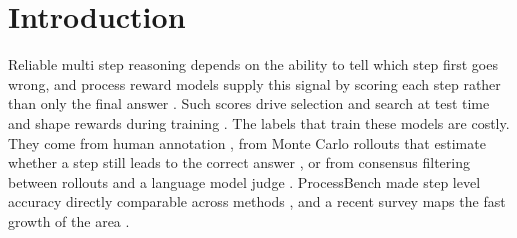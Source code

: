 
\section{Introduction}
\label{sec:intro}

Reliable multi step reasoning depends on the ability to tell which step first goes wrong, and process reward models supply this signal by scoring each step rather than only the final answer \citep{cobbe2021gsm8k, uesato2022solving, lightman2023lets}. Such scores drive selection and search at test time and shape rewards during training \citep{wang2022selfconsistency, snell2024scaling}. The labels that train these models are costly. They come from human annotation \citep{lightman2023lets}, from Monte Carlo rollouts that estimate whether a step still leads to the correct answer \citep{wang2023mathshepherd}, or from consensus filtering between rollouts and a language model judge \citep{zhang2025lessons}. ProcessBench made step level accuracy directly comparable across methods \citep{zheng2024processbench}, and a recent survey maps the fast growth of the area \citep{zheng2025survey}.

